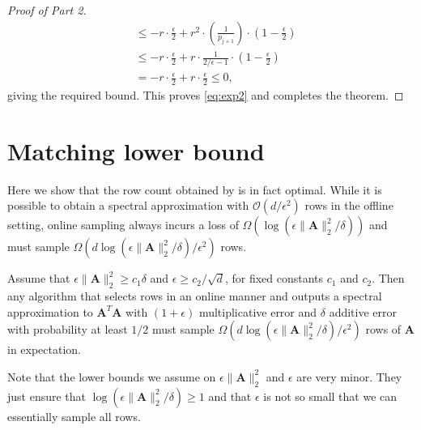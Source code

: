 \documentclass{toc}
\newcommand{\Oh}{\ensuremath{\mathcal{O}}}
\newcommand{\bv}[1]{\mathbf{#1}}
\newcommand{\norm}[1]{\|#1\|}
\begin{document}
\begin{proof}[Proof of  Part 2]
\begin{align*}
 & \le  -r \cdot \frac{\epsilon}{2} + r^2 \cdot \left (\frac{1}{p_{j+1}}\right ) \cdot \left (1-\frac{\epsilon}{2}\right)\\
 & \le  -r \cdot \frac{\epsilon}{2} + r \cdot \frac{1}{2/\epsilon-1} \cdot \left (1-\frac{\epsilon}{2}\right)\\
  & =  -r \cdot \frac{\epsilon}{2} + r \cdot \frac{\epsilon}{2} \le 0,
 \end{align*}
 giving the required bound. This proves \eqref{eq:exp2} and completes the theorem.
%
%
%
%
%
%
%
%
%
\end{proof}

\section{Matching lower bound}
\label{sec:lower}

Here we show that the row count obtained by  is in fact optimal. While it is possible to obtain a spectral approximation with $\Oh(d/\epsilon^2)$ rows in the offline setting, online sampling always incurs a loss of $\Omega \left (\log(\epsilon\norm{\bv A}^2_2/\delta) \right)$ and must sample $\Omega \left (d\log(\epsilon\norm{\bv A}^2_2/\delta)/\epsilon^2 \right)$ rows.

\begin{theorem}
	\label{thm:lower_bound}
	Assume that $\epsilon \norm{\bv{A}}_2^2 \ge c_1\delta$ and $\epsilon \ge c_2/\sqrt{d}$, for fixed constants $c_1$ and $c_2$.
	Then any algorithm that selects rows in an online manner and outputs a spectral approximation to $\bv{A}^T\bv{A}$ with $(1+\epsilon)$ multiplicative  error and $\delta$ additive error with probability at least $1/2$ must sample $\Omega \left (d\log(\epsilon\norm{\bv A}^2_2/\delta)/\epsilon^2 \right)$ rows of $\bv{A}$ in expectation.
\end{theorem}

Note that the lower bounds we assume on $\epsilon \norm{\bv{A}}_2^2$ and $\epsilon$ are very minor. They just ensure that $\log(\epsilon\norm{\bv A}^2_2/\delta) \ge 1$ and that $\epsilon$ is not so small that we can essentially sample all rows.
\end{document}
